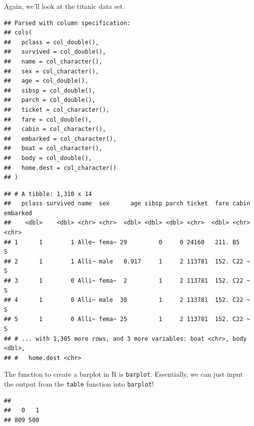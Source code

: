 \documentclass[
]{book}
\newenvironment{Shaded}{\begin{snugshade}}{\end{snugshade}}
\newcommand{\KeywordTok}[1]{\textcolor[rgb]{0.13,0.29,0.53}{\textbf{#1}}}
\newcommand{\NormalTok}[1]{#1}
\newcommand{\OperatorTok}[1]{\textcolor[rgb]{0.81,0.36,0.00}{\textbf{#1}}}
\theoremstyle{definition}
\theoremstyle{definition}
\theoremstyle{definition}
\theoremstyle{remark}
\begin{document}
Again, we'll look at the titanic data set.

\begin{verbatim}
## Parsed with column specification:
## cols(
##   pclass = col_double(),
##   survived = col_double(),
##   name = col_character(),
##   sex = col_character(),
##   age = col_double(),
##   sibsp = col_double(),
##   parch = col_double(),
##   ticket = col_character(),
##   fare = col_double(),
##   cabin = col_character(),
##   embarked = col_character(),
##   boat = col_character(),
##   body = col_double(),
##   home.dest = col_character()
## )
\end{verbatim}

\begin{verbatim}
## # A tibble: 1,310 x 14
##   pclass survived name  sex      age sibsp parch ticket  fare cabin embarked
##    <dbl>    <dbl> <chr> <chr>  <dbl> <dbl> <dbl> <chr>  <dbl> <chr> <chr>   
## 1      1        1 Alle~ fema~ 29         0     0 24160   211. B5    S       
## 2      1        1 Alli~ male   0.917     1     2 113781  152. C22 ~ S       
## 3      1        0 Alli~ fema~  2         1     2 113781  152. C22 ~ S       
## 4      1        0 Alli~ male  30         1     2 113781  152. C22 ~ S       
## 5      1        0 Alli~ fema~ 25         1     2 113781  152. C22 ~ S       
## # ... with 1,305 more rows, and 3 more variables: boat <chr>, body <dbl>,
## #   home.dest <chr>
\end{verbatim}

The function to create a barplot in R is \texttt{barplot}. Essentially, we can just input the output from the \texttt{table} function into \texttt{barplot}!

\begin{Shaded}
\end{Shaded}

\begin{verbatim}
## 
##   0   1 
## 809 500
\end{verbatim}

\begin{Shaded}
\end{Shaded}
\end{document}
